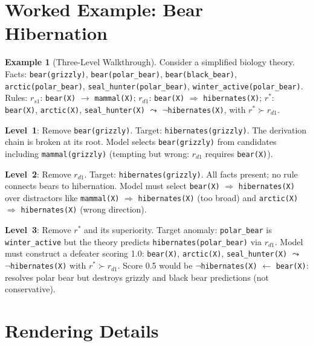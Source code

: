 \documentclass{article}
\theoremstyle{definition}
\newtheorem{example}[theorem]{Example}
\newcommand{\defto}{\Rightarrow}
\newcommand{\strictto}{\rightarrow}
\newcommand{\defeatto}{\leadsto}
\begin{document}
\section{Worked Example: Bear Hibernation}\label{app:example}

\begin{example}[Three-Level Walkthrough]\label{ex:bear}
Consider a simplified biology theory. Facts: \texttt{bear(grizzly)}, \texttt{bear(polar\_bear)}, \texttt{bear(black\_bear)}, \texttt{arctic(polar\_bear)}, \texttt{seal\_hunter(polar\_bear)}, \texttt{winter\_active(polar\_bear)}. Rules: $r_{s1}$: \texttt{bear(X)} $\strictto$ \texttt{mammal(X)}; $r_{d1}$: \texttt{bear(X)} $\defto$ \texttt{hibernates(X)}; $r^*$: \texttt{bear(X)}, \texttt{arctic(X)}, \texttt{seal\_hunter(X)} $\defeatto$ $\neg$\texttt{hibernates(X)}, with $r^* \succ r_{d1}$.

\textbf{Level~1}: Remove \texttt{bear(grizzly)}. Target: \texttt{hibernates(grizzly)}. The derivation chain is broken at its root. Model selects \texttt{bear(grizzly)} from candidates including \texttt{mammal(grizzly)} (tempting but wrong: $r_{d1}$ requires \texttt{bear(X)}).

\textbf{Level~2}: Remove $r_{d1}$. Target: \texttt{hibernates(grizzly)}. All facts present; no rule connects bears to hibernation. Model must select \texttt{bear(X)} $\defto$ \texttt{hibernates(X)} over distractors like \texttt{mammal(X)} $\defto$ \texttt{hibernates(X)} (too broad) and \texttt{arctic(X)} $\defto$ \texttt{hibernates(X)} (wrong direction).

\textbf{Level~3}: Remove $r^*$ and its superiority. Target anomaly: \texttt{polar\_bear} is \texttt{winter\_active} but the theory predicts \texttt{hibernates(polar\_bear)} via $r_{d1}$. Model must construct a defeater scoring 1.0: \texttt{bear(X)}, \texttt{arctic(X)}, \texttt{seal\_hunter(X)} $\defeatto$ $\neg$\texttt{hibernates(X)} with $r^* \succ r_{d1}$. Score 0.5 would be $\neg$\texttt{hibernates(X)} $\leftarrow$ \texttt{bear(X)}: resolves polar bear but destroys grizzly and black bear predictions (not conservative).
\end{example}


\section{Rendering Details}\label{app:rendering}
\end{document}
